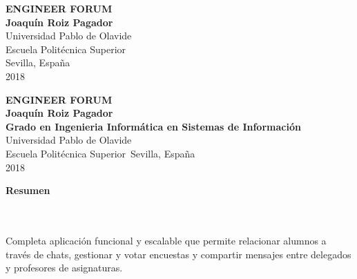 \begin{center}
\begin{figure}
\centering%
%
\end{figure}
\begin{figure}
\centering%
%
\end{figure}
\thispagestyle{empty} \vspace*{2.0cm} \textbf{\huge
ENGINEER FORUM}\\[2.0cm]
\Large\textbf{Joaqu\'{i}n Roiz Pagador}\\[1.0cm]
\small Universidad Pablo de Olavide\\
Escuela Polit\'{e}cnica Superior\\
Sevilla, Espa\~{n}a\\
2018\\
\end{center}

\newpage{\pagestyle{empty}\cleardoublepage}

\newpage
\begin{center}
\thispagestyle{empty} \vspace*{0cm} \textbf{\huge
ENGINEER FORUM}\\[2.0cm]
\Large\textbf{Joaqu\'{i}n Roiz Pagador}\\[5.0cm]
\textbf{Grado en Ingenieria Inform\'{a}tica en Sistemas de Informaci\'{o}n}\\[4cm]
Universidad Pablo de Olavide\\
Escuela Polit\'{e}cnica Superior\
Sevilla, Espa\~{n}a\\
2018\\
\end{center}



\newpage{\pagestyle{empty}\cleardoublepage}

\newpage
\textbf{\LARGE Resumen}
\\\\
Completa aplicaci\'{o}n funcional y escalable que permite relacionar alumnos a trav\'{e}s de chats, gestionar y votar encuestas y compartir mensajes entre delegados y profesores de asignaturas.\\

